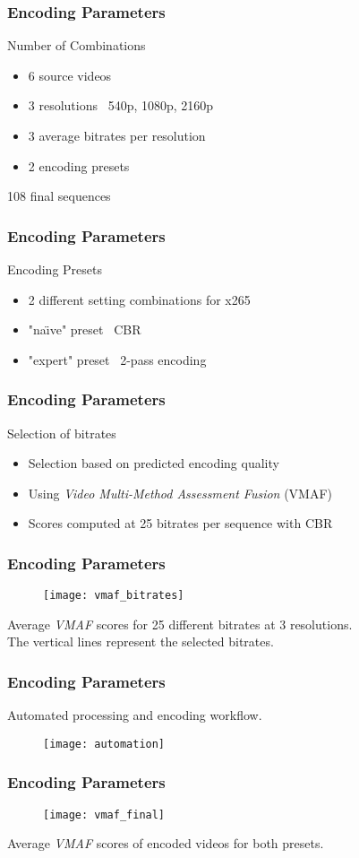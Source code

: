 \begin{frame}
	\frametitle{Encoding Parameters}
	
	\large{Number of Combinations}
	\begin{itemize}
		\item 6 source videos
		\item 3 resolutions \textendash\ 540p, 1080p, 2160p
		\item 3 average bitrates per resolution
		\item 2 encoding presets
	\end{itemize}
	108 final sequences
\end{frame}

\begin{frame}
	\frametitle{Encoding Parameters}
	
	\large{Encoding Presets}
	\begin{itemize}
		\item 2 different setting combinations for x265
		\item "na\"{\i}ve" preset \textendash\ CBR
		\item "expert" preset \textendash\ 2-pass encoding
	\end{itemize}
\end{frame}

\begin{frame}
	\frametitle{Encoding Parameters}
	\large{Selection of bitrates}
	\begin{itemize}
		\item Selection based on predicted encoding quality
		\item Using \textit{Video Multi-Method Assessment Fusion} (VMAF) \cite{lin2013:mmf}
		\item Scores computed at 25 bitrates per sequence with CBR
	\end{itemize}
\end{frame}

\begin{frame}
	\frametitle{Encoding Parameters}
	\begin{figure}
		\centering
		\texttt{[image: vmaf\_bitrates]}
	\end{figure}
	Average \textit{VMAF} scores for 25 different bitrates at 3 resolutions.\\
	The vertical lines represent the selected bitrates.
\end{frame}

\begin{frame}
	\frametitle{Encoding Parameters}
	
	\large{Automated processing and encoding workflow.}

	\begin{figure}
		\texttt{[image: automation]}
	\end{figure}
\end{frame}

\begin{frame}
	\frametitle{Encoding Parameters}

	\begin{figure}[thb!]
		\centering
		\texttt{[image: vmaf\_final]}
	\end{figure}

	Average \textit{VMAF} scores of encoded videos for both presets.
\end{frame}
